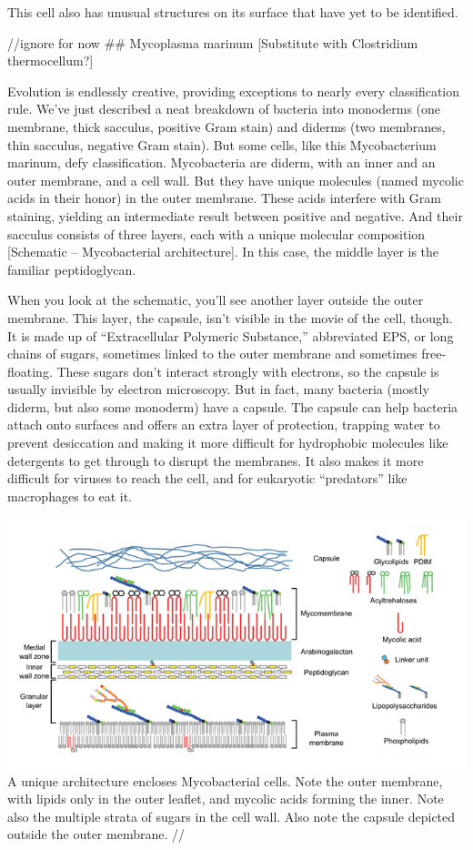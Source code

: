 \documentclass[]{book}
\begin{document}
This cell also has unusual structures on its surface that have yet to be
identified.

//ignore for now \#\# Mycoplasma marinum {[}Substitute with Clostridium
thermocellum?{]}

Evolution is endlessly creative, providing exceptions to nearly every
classification rule. We've just described a neat breakdown of bacteria
into monoderms (one membrane, thick sacculus, positive Gram stain) and
diderms (two membranes, thin sacculus, negative Gram stain). But some
cells, like this Mycobacterium marinum, defy classification.
Mycobacteria are diderm, with an inner and an outer membrane, and a cell
wall. But they have unique molecules (named mycolic acids in their
honor) in the outer membrane. These acids interfere with Gram staining,
yielding an intermediate result between positive and negative. And their
sacculus consists of three layers, each with a unique molecular
composition {[}Schematic -- Mycobacterial architecture{]}. In this case,
the middle layer is the familiar peptidoglycan.

When you look at the schematic, you'll see another layer outside the
outer membrane. This layer, the capsule, isn't visible in the movie of
the cell, though. It is made up of ``Extracellular Polymeric
Substance,'' abbreviated EPS, or long chains of sugars, sometimes linked
to the outer membrane and sometimes free-floating. These sugars don't
interact strongly with electrons, so the capsule is usually invisible by
electron microscopy. But in fact, many bacteria (mostly diderm, but also
some monoderm) have a capsule. The capsule can help bacteria attach onto
surfaces and offers an extra layer of protection, trapping water to
prevent desiccation and making it more difficult for hydrophobic
molecules like detergents to get through to disrupt the membranes. It
also makes it more difficult for viruses to reach the cell, and for
eukaryotic ``predators'' like macrophages to eat it.

\includegraphics{img/02_schematic/2_5_1_Mycobacteria.png} A unique
architecture encloses Mycobacterial cells. Note the outer membrane, with
lipids only in the outer leaflet, and mycolic acids forming the inner.
Note also the multiple strata of sugars in the cell wall. Also note the
capsule depicted outside the outer membrane. //
\end{document}
